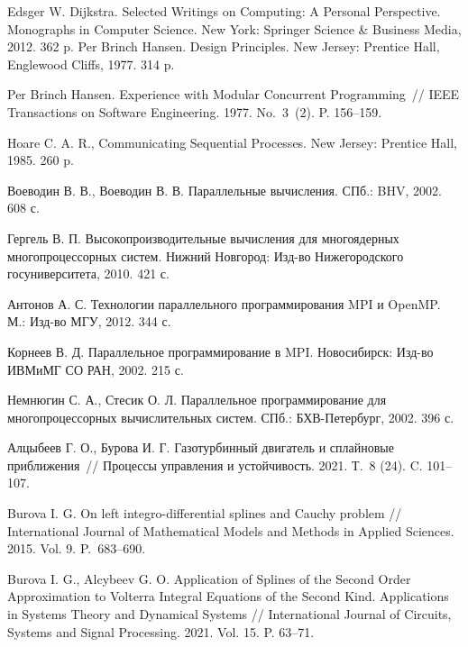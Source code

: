 \documentclass{spisok-article}
\begin{document}
\begin{thebibliography}{88}

Edsger W. Dijkstra. Selected Writings on Computing: A Personal Perspective. Monographs in Computer Science. New York: Springer Science \& Business Media, 2012. 362 p.
Per Brinch Hansen. Design Principles. New Jersey: Prentice Hall, Englewood Cliffs, 1977. 314 p.

Per Brinch Hansen. Experience with Modular Concurrent Programming~// IEEE Transactions on Software Engineering. 1977. No.~3~(2). P. 156--159.

Hoare C. A. R., Communicating Sequential Processes. New Jersey: Prentice Hall, 1985. 260 p.

Воеводин В. В., Воеводин В. В. Параллельные вычисления. СПб.: BHV, 2002. 608 с.

Гергель В. П. Высокопроизводительные вычисления для многоядерных многопроцессорных систем. Нижний Новгород: Изд-во Нижегородского госуниверситета, 2010. 421 с.

Антонов А. С. Технологии параллельного программирования MPI и OpenMP. М.: Изд-во МГУ, 2012. 344 с.

Корнеев В. Д. Параллельное программирование в MPI. Новосибирск: Изд-во ИВМиМГ СО РАН, 2002. 215 с.

Немнюгин С. А., Стесик О. Л. Параллельное программирование для многопроцессорных вычислительных систем. СПб.: БХВ-Петербург, 2002. 396 с.




Алцыбеев Г. О., Бурова И. Г. Газотурбинный двигатель и сплайновые приближения~// Процессы управления и устойчивость. 2021. Т.~8 (24). C. 101--107.

Burova I. G. On left integro-differential splines and Cauchy problem // International Journal of Mathematical Models and Methods in Applied Sciences. 2015. Vol. 9. P.~683--690.

Burova I. G., Alcybeev G. O. Application of Splines of the Second Order Approximation to Volterra Integral Equations of the Second Kind. Applications in Systems Theory and Dynamical Systems // International Journal of Circuits, Systems and Signal Processing. 2021. Vol. 15. P. 63--71.

\end{thebibliography}
\end{document}
